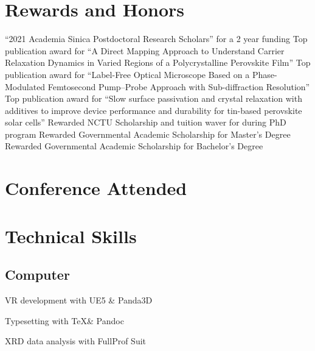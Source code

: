 \documentclass[11pt,a4paper]{moderncv}
\begin{document}
\section{Rewards and Honors}
		{``2021 Academia Sinica Postdoctoral 
		Research Scholars'' for a 2 year funding}
		{Top publication award for ``A Direct Mapping 
		Approach to Understand Carrier Relaxation 
		Dynamics in Varied Regions of a 
		Polycrystalline Perovskite Film''}
		{Top publication award for ``Label-Free Optical 
		Microscope Based on a Phase-Modulated Femtosecond 
		Pump–Probe Approach with Sub-diffraction Resolution''}
		{Top publication award for ``Slow surface 
		passivation and crystal relaxation with additives to 
		improve device performance and durability for tin-based 
		perovskite solar cells''}
		{Rewarded NCTU Scholarship and tuition waver 
		for during PhD program}
		{Rewarded Governmental Academic Scholarship 
		for Master's Degree}
		{Rewarded Governmental Academic Scholarship 
		for Bachelor's Degree}
\section{Conference Attended}
\section{Technical Skills}
	\subsection{Computer}
					{\small \raggedright VR development with UE5 \& Panda3D}
					{\small \raggedright Typesetting with \TeX\:\& Pandoc}
					{\small \raggedright XRD data analysis with FullProf Suit}
\end{document}
